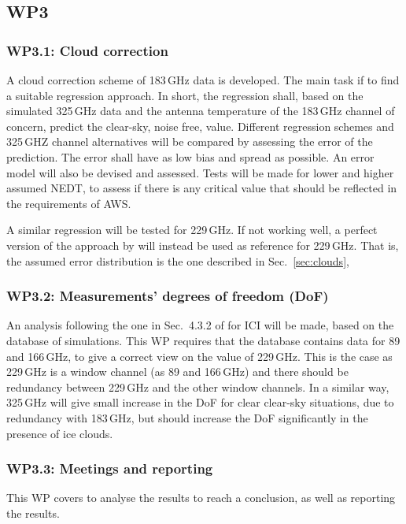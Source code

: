 \documentclass[BCOR=1cm,12pt,bibliography=totoc]{article}
\begin{document}
\subsection*{WP3}
%
\subsubsection*{WP3.1: Cloud correction}
%
A cloud correction scheme of 183\,GHz data is developed. The main task if to
find a suitable regression approach. In short, the regression shall, based on
the simulated 325\,GHz data and the antenna temperature of the 183\,GHz channel
of concern, predict the clear-sky, noise free, value. Different regression
schemes and 325\,GHZ channel alternatives will be compared by assessing the
error of the prediction. The error shall have as low bias and spread as
possible. An error model will also be devised and assessed. Tests will be made
for lower and higher assumed NEDT, to assess if there is any critical value
that should be reflected in the requirements of AWS.

A similar regression will be tested for 229\,GHz. If not working well, a
perfect version of the approach by \citet{rekha2012potential} will instead be
used as reference for 229\,GHz. That is, the assumed error distribution is the
one described in Sec.~\ref{sec:clouds},


\subsubsection*{WP3.2: Measurements’ degrees of freedom (DoF)}
%
An analysis following the one in Sec.~4.3.2 of \citet[][]{eriksson:towar:20}
for ICI will be made, based on the database of simulations. This WP requires
that the database contains data for 89 and 166\,GHz, to give a correct view on
the value of 229\,GHz. This is the case as 229\,GHz is a window channel (as 89
and 166\,GHz) and there should be redundancy between 229\,GHz and the other
window channels. In a similar way, 325\,GHz will give small increase in the DoF
for clear clear-sky situations, due to redundancy with 183\,GHz, but should
increase the DoF significantly in the presence of ice clouds.  


\subsubsection*{WP3.3: Meetings and reporting}
%
This WP covers to analyse the results to reach a conclusion, as well as
reporting the results. 
\end{document}

